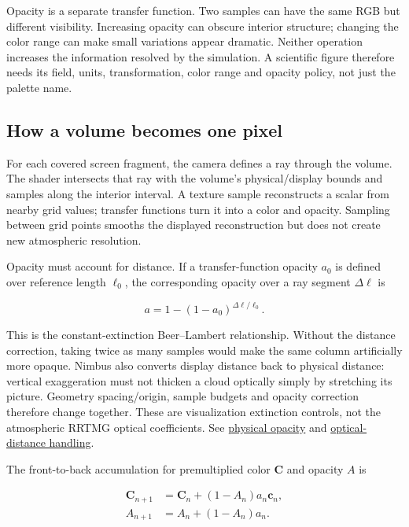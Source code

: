 \documentclass[
  11pt,
]{article}
\begin{document}
Opacity is a separate transfer function. Two samples can have the same
RGB but different visibility. Increasing opacity can obscure interior
structure; changing the color range can make small variations appear
dramatic. Neither operation increases the information resolved by the
simulation. A scientific figure therefore needs its field, units,
transformation, color range and opacity policy, not just the palette
name.

\subsection{How a volume becomes one
pixel}\label{how-a-volume-becomes-one-pixel}

For each covered screen fragment, the camera defines a ray through the
volume. The shader intersects that ray with the volume's
physical/display bounds and samples along the interior interval. A
texture sample reconstructs a scalar from nearby grid values; transfer
functions turn it into a color and opacity. Sampling between grid points
smooths the displayed reconstruction but does not create new atmospheric
resolution.

Opacity must account for distance. If a transfer-function opacity
\(a_0\) is defined over reference length \(\ell_0\), the corresponding
opacity over a ray segment \(\Delta\ell\) is

\[a=1-(1-a_0)^{\Delta\ell/\ell_0}.\]

This is the constant-extinction Beer--Lambert relationship. Without the
distance correction, taking twice as many samples would make the same
column artificially more opaque. Nimbus also converts display distance
back to physical distance: vertical exaggeration must not thicken a
cloud optically simply by stretching its picture. Geometry
spacing/origin, sample budgets and opacity correction therefore change
together. These are visualization extinction controls, not the
atmospheric RRTMG optical coefficients. See
\href{../ui/src/lib/vtk/vtkPhysicalVolumeOpacity.ts}{physical opacity}
and \href{../ui/src/lib/vtk/volumeOpticalDepth.ts}{optical-distance
handling}.

The front-to-back accumulation for premultiplied color \(\boldsymbol C\)
and opacity \(A\) is

\[\begin{aligned}
\boldsymbol C_{n+1}&=\boldsymbol C_n+(1-A_n)a_n\boldsymbol c_n,\\
A_{n+1}&=A_n+(1-A_n)a_n.
\end{aligned}\]
\end{document}
